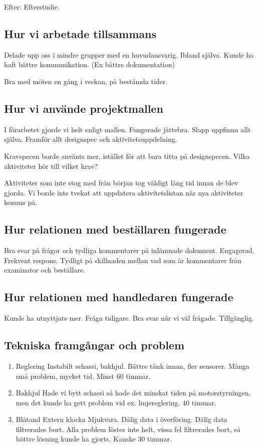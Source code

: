 \documentclass[a4paper,12pt]{article}
\begin{document}
Efter: Efterstudie. 

\subsection{Hur vi arbetade tillsammans}
Delade upp oss i mindre grupper med en huvudansvarig. Ibland själva. Kunde ha haft bättre kommunikation. (Ex bättre dokumentation) 

Bra med möten en gång i veckan, på bestämda tider. 

\subsection{Hur vi använde projektmallen}
I förarbetet gjorde vi helt enligt mallen. Fungerade jättebra. Slapp uppfinna allt själva. Framför allt designspec och aktivitetsuppdelning. 

Kravspecen borde använts mer, istället för att bara titta på designspecen. Vilka aktiviteter hör till vilket krav? 

Aktiviteter som inte stog med från början tog väldigt lång tid innan de blev gjorda. Vi borde inte tvekat att uppdatera aktivitetslistan när nya aktiviteter komms på. 

\subsection{Hur relationen med beställaren fungerade}
Bra svar på frågor och tydliga kommentarer på inlämnade dokument. Engagerad. Frekvent respons. Tydligt på skillnaden mellan vad som 
är kommentarer från examinator och beställare. 

\subsection{Hur relationen med handledaren fungerade}
Kunde ha utnyttjats mer. Fråga tidigare. Bra svar när vi väl frågade. Tillgänglig. 

\subsection{Tekniska framgångar och problem}

\begin{enumerate}
\item Reglering
Instabilt schassi, bakhjul. 
Bättre tänk innan, fler sensorer.
Många små problem, mycket tid. Minst 60 timmar. 

\item Bakhjul
Hade vi bytt schassi så hade det minskat tiden på motorstyrningen, men det kunde ha gett problem vid ex. linjereglering. 
40 timmar. 

\item Blåtand 
Extern klocka
Mjukvara. 
Dålig data i överföring. Dålig data filtrerades bort. 
Alla problem löstes inte helt, vissa fel filtrerades bort, så bättre lösning kunde ha gjorts. 
Kanske 30 timmar. 
\end{enumerate}
\end{document}
